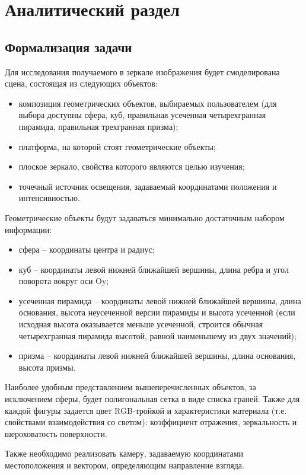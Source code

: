 \chapter{Аналитический раздел}

\section{Формализация задачи}

Для исследования получаемого в зеркале изображения будет смоделирована сцена, состоящая из следующих объектов:
\begin{itemize}
	\item композиция геометрических объектов, выбираемых пользователем (для
	выбора доступны сфера, куб, правильная усеченная четырехгранная пирамида, правильная трехгранная призма);
	\item платформа, на которой стоят геометрические объекты;
	\item плоское зеркало, свойства которого являются целью изучения;
	\item точечный источник освещения, задаваемый координатами положения и интенсивностью.
\end{itemize}

Геометрические объекты будут задаваться минимально достаточным набором информации:
\begin{itemize}
	\item сфера -- координаты центра и радиус;
	\item куб -- координаты левой нижней ближайшей вершины, длина ребра и угол поворота вокруг оси Oy;
	\item усеченная пирамида -- координаты левой нижней ближайшей вершины, длина основания, высота неусеченной версии пирамиды и высота усеченной (если исходная высота оказывается меньше усеченной, строится обычная четырехгранная пирамида высотой, равной наименьшему из двух значений);
	\item призма -- координаты левой нижней ближайшей вершины, длина основания, высота призмы.
\end{itemize}
Наиболее удобным представлением вышеперечисленных объектов, за исключением сферы, будет полигональная сетка в виде списка граней. Также для каждой фигуры задается цвет RGB-тройкой и характеристики материала (т.е. свойствами взаимодействия со светом): коэффициент отражения, зеркальность и шероховатость поверхности.

Также необходимо реализовать камеру, задаваемую координатами местоположения и вектором, определяющим направление взгляда.

